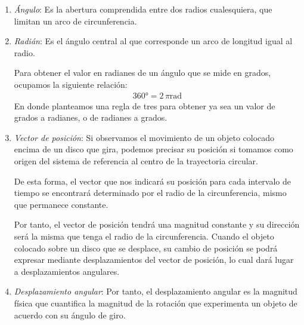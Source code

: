 \documentclass[12pt]{article}
\begin{document}
\begin{enumerate}
\item \textit{Ángulo}: Es la abertura comprendida entre dos radios cualesquiera, que limitan un arco de circunferencia.
\item \textit{Radián}: Es el ángulo central al que corresponde un arco de longitud igual al radio.
\begin{figure}[H]
\centering
{}
\end{figure}
Para obtener el valor en radianes de un ángulo que se mide en grados, ocupamos la siguiente relación:
\begin{align*}
\ang{360} = 2 \, \pi \unit{\radian}
\end{align*}
En donde planteamos una regla de tres para obtener ya sea un valor de grados a radianes, o de radianes a grados.
\item \textit{Vector de posición}: Si observamos el movimiento de un objeto colocado encima de un disco que gira, podemos precisar su posición si tomamos como origen del sistema de referencia al centro de la trayectoria circular.

De esta forma, el vector que nos indicará su posición para cada intervalo de tiempo se encontrará determinado por el radio de la circunferencia, mismo que permanece constante.

Por tanto, el vector de posición tendrá una magnitud constante y su dirección será la misma que tenga el radio de la circunferencia. Cuando el objeto colocado sobre un disco que se desplace, su cambio de posición se podrá expresar mediante desplazamientos del vector de posición, lo cual dará lugar a desplazamientos angulares.
\item \textit{Desplazamiento angular}: Por tanto, el desplazamiento angular es la magnitud física que cuantifica la magnitud de la rotación que experimenta un objeto de acuerdo con su ángulo de giro.


\end{enumerate}
\end{document}
